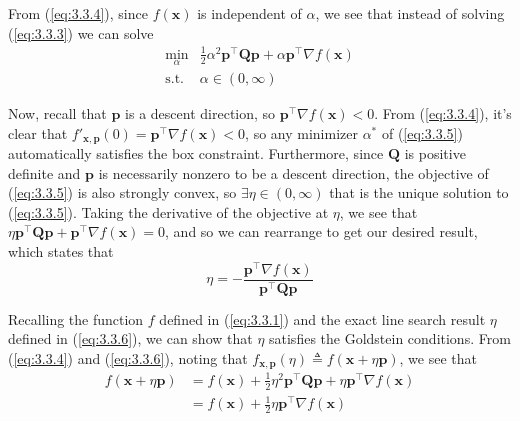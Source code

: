 \documentclass{article}
\begin{document}
From (\ref{eq:3.3.4}), since $ f(\mathbf{x}) $ is independent of $ \alpha $,
we see that instead of solving (\ref{eq:3.3.3}) we can solve
\begin{equation} \label{eq:3.3.5}
    \begin{array}{ll}
        \displaystyle\min_\alpha &
        \frac{1}{2}\alpha^2\mathbf{p}^\top\mathbf{Qp} +
        \alpha\mathbf{p}^\top\nabla f(\mathbf{x}) \\
        \text{s.t.} & \alpha \in (0, \infty)
    \end{array}
\end{equation}

Now, recall that $ \mathbf{p} $ is a descent direction, so
$ \mathbf{p}^\top\nabla f(\mathbf{x}) < 0 $. From (\ref{eq:3.3.4}), it's
clear that $ f'_{\mathbf{x}, \mathbf{p}}(0) =
\mathbf{p}^\top\nabla f(\mathbf{x}) < 0 $, so any minimizer $ \alpha^* $ of
(\ref{eq:3.3.5}) automatically satisfies the box constraint. Furthermore,
since $ \mathbf{Q} $ is positive definite and $ \mathbf{p} $ is necessarily
nonzero to be a descent direction, the objective of (\ref{eq:3.3.5}) is also
strongly convex, so $ \exists \eta \in (0, \infty) $ that is the unique
solution to (\ref{eq:3.3.5}). Taking the derivative of the objective at
$ \eta $, we see that
$ \eta\mathbf{p}^\top\mathbf{Qp} + \mathbf{p}^\top\nabla f(\mathbf{x}) = 0 $,
and so we can rearrange to get our desired result, which states that
\begin{equation} \label{eq:3.3.6}
    \eta =
    -\frac{\mathbf{p}^\top\nabla f(\mathbf{x})}{\mathbf{p}^\top\mathbf{Qp}}
\end{equation}


Recalling the function $ f $ defined in (\ref{eq:3.3.1}) and the exact line
search result $ \eta $ defined in (\ref{eq:3.3.6}), we can show that $ \eta $
satisfies the Goldstein conditions. From (\ref{eq:3.3.4}) and
(\ref{eq:3.3.6}), noting that $ f_{\mathbf{x}, \mathbf{p}}(\eta) \triangleq
f(\mathbf{x} + \eta\mathbf{p}) $, we see that
\begin{equation} \label{eq:3.4.1}
    \begin{split}
        f(\mathbf{x} + \eta\mathbf{p}) & =
        f(\mathbf{x}) + \frac{1}{2}\eta^2\mathbf{p}^\top\mathbf{Qp} +
        \eta\mathbf{p}^\top\nabla f(\mathbf{x}) \\
        & =
        f(\mathbf{x}) + \frac{1}{2}\eta\mathbf{p}^\top\nabla f(\mathbf{x})
    \end{split}
\end{equation}
\end{document}
